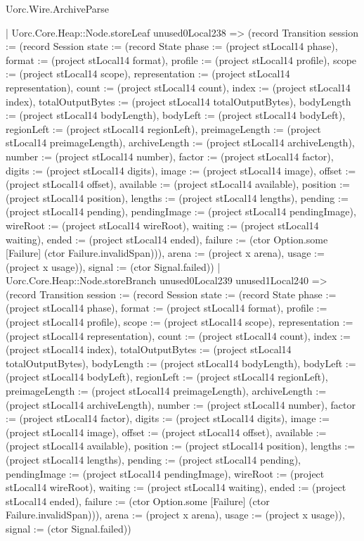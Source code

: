 \begin{lexlean}{Uorc.Wire.ArchiveParse}
\begin{semanticmodule}
{            | Uorc.Core.Heap::Node.storeLeaf unused0Local238 => (record Transition {session := (record Session {state := (record State {phase := (project stLocal14 phase), format := (project stLocal14 format), profile := (project stLocal14 profile), scope := (project stLocal14 scope), representation := (project stLocal14 representation), count := (project stLocal14 count), index := (project stLocal14 index), totalOutputBytes := (project stLocal14 totalOutputBytes), bodyLength := (project stLocal14 bodyLength), bodyLeft := (project stLocal14 bodyLeft), regionLeft := (project stLocal14 regionLeft), preimageLength := (project stLocal14 preimageLength), archiveLength := (project stLocal14 archiveLength), number := (project stLocal14 number), factor := (project stLocal14 factor), digits := (project stLocal14 digits), image := (project stLocal14 image), offset := (project stLocal14 offset), available := (project stLocal14 available), position := (project stLocal14 position), lengths := (project stLocal14 lengths), pending := (project stLocal14 pending), pendingImage := (project stLocal14 pendingImage), wireRoot := (project stLocal14 wireRoot), waiting := (project stLocal14 waiting), ended := (project stLocal14 ended), failure := (ctor Option.some [Failure] (ctor Failure.invalidSpan))}), arena := (project x arena), usage := (project x usage)}), signal := (ctor Signal.failed)})
            | Uorc.Core.Heap::Node.storeBranch unused0Local239 unused1Local240 => (record Transition {session := (record Session {state := (record State {phase := (project stLocal14 phase), format := (project stLocal14 format), profile := (project stLocal14 profile), scope := (project stLocal14 scope), representation := (project stLocal14 representation), count := (project stLocal14 count), index := (project stLocal14 index), totalOutputBytes := (project stLocal14 totalOutputBytes), bodyLength := (project stLocal14 bodyLength), bodyLeft := (project stLocal14 bodyLeft), regionLeft := (project stLocal14 regionLeft), preimageLength := (project stLocal14 preimageLength), archiveLength := (project stLocal14 archiveLength), number := (project stLocal14 number), factor := (project stLocal14 factor), digits := (project stLocal14 digits), image := (project stLocal14 image), offset := (project stLocal14 offset), available := (project stLocal14 available), position := (project stLocal14 position), lengths := (project stLocal14 lengths), pending := (project stLocal14 pending), pendingImage := (project stLocal14 pendingImage), wireRoot := (project stLocal14 wireRoot), waiting := (project stLocal14 waiting), ended := (project stLocal14 ended), failure := (ctor Option.some [Failure] (ctor Failure.invalidSpan))}), arena := (project x arena), usage := (project x usage)}), signal := (ctor Signal.failed)})
}
\end{semanticmodule}
\end{lexlean}
